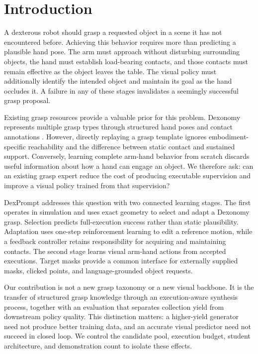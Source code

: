 \documentclass[letterpaper,10pt,conference]{ieeeconf}
\begin{document}
\section{Introduction}
A dexterous robot should grasp a requested object in a scene it has not encountered before. Achieving this behavior requires more than predicting a plausible hand pose. The arm must approach without disturbing surrounding objects, the hand must establish load-bearing contacts, and those contacts must remain effective as the object leaves the table. The visual policy must additionally identify the intended object and maintain its goal as the hand occludes it. A failure in any of these stages invalidates a seemingly successful grasp proposal.

Existing grasp resources provide a valuable prior for this problem. Dexonomy represents multiple grasp types through structured hand poses and contact annotations \cite{dexonomy}. However, directly replaying a grasp template ignores embodiment-specific reachability and the difference between static contact and sustained support. Conversely, learning complete arm-hand behavior from scratch discards useful information about how a hand can engage an object. We therefore ask: can an existing grasp expert reduce the cost of producing executable supervision and improve a visual policy trained from that supervision?

DexPrompt addresses this question with two connected learning stages. The first operates in simulation and uses exact geometry to select and adapt a Dexonomy grasp. Selection predicts full-execution success rather than static plausibility. Adaptation uses one-step reinforcement learning to edit a reference motion, while a feedback controller retains responsibility for acquiring and maintaining contacts. The second stage learns visual arm-hand actions from accepted executions. Target masks provide a common interface for externally supplied masks, clicked points, and language-grounded object requests.

Our contribution is not a new grasp taxonomy or a new visual backbone. It is the transfer of structured grasp knowledge through an execution-aware synthesis process, together with an evaluation that separates collection yield from downstream policy quality. This distinction matters: a higher-yield generator need not produce better training data, and an accurate visual predictor need not succeed in closed loop. We control the candidate pool, execution budget, student architecture, and demonstration count to isolate these effects.
\end{document}
